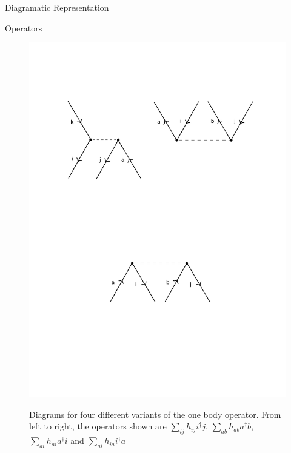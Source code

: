 \documentclass[twoside,english]{uiofysmaster}
\begin{document}
\begin{chapter}{Diagramatic Representation}
\begin{section}{Operators}
		\begin{figure}[H]
			\includegraphics[width=\textwidth]{Figures/TwoBodyOperator2.pdf}
			\label{TwoBodyOperator2}
			\caption{Diagrams for four different variants of the one body operator. From left to right, the operators shown are $\sum_{ij} h_{ij} i^\dagger j $, $\sum_{ab} h_{ab} a^\dagger b$, $\sum_{ai}h_{ai} a^\dagger i$ and $\sum_{ai} h_{ia} i^\dagger a$}
		\end{figure}

	\end{section}


\end{chapter}
\end{document}
